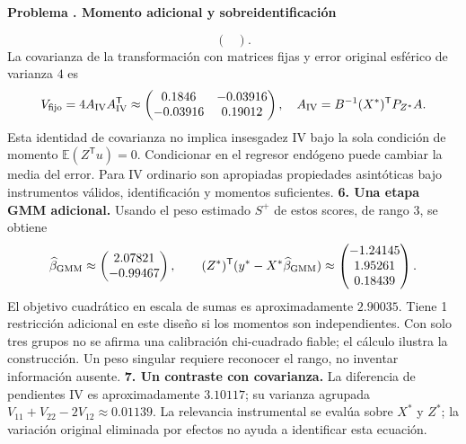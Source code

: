 \documentclass[11pt,a4paper]{article}
\newcommand{\E}{\mathbb E}
\newcommand{\T}{^{\mathsf T}}
\theoremstyle{definition}
\newcounter{problema}
\newenvironment{resuelto}[1]{\refstepcounter{problema}\par\medskip\Needspace{6\baselineskip}\textbf{Problema \theproblema. #1}\par}{\par\medskip}
\begin{document}
\begin{resuelto}{Momento adicional y sobreidentificación}
\[\begin{pmatrix}
\end{pmatrix}.
\]
La covarianza de la transformación con matrices fijas y error original esférico de varianza $4$ es
\[
V_{\rm fijo}=4A_{\rm IV}A_{\rm IV}\T\approx\begin{pmatrix}
0.1846&-0.03916\\-0.03916&0.19012
\end{pmatrix},\quad A_{\rm IV}=B^{-1}(X^*)\T P_{Z^*}A.
\]
Esta identidad de covarianza no implica insesgadez IV bajo la sola condición de momento $\E(Z\T u)=0$. Condicionar en el regresor endógeno puede cambiar la media del error. Para IV ordinario son apropiadas propiedades asintóticas bajo instrumentos válidos, identificación y momentos suficientes.
\textbf{6. Una etapa GMM adicional.} Usando el peso estimado $S^+$ de estos scores, de rango $3$, se obtiene
\[
\widehat\beta_{\rm GMM}\approx\begin{pmatrix}
2.07821\\-0.99467
\end{pmatrix},\qquad
(Z^*)\T(y^*-X^*\widehat\beta_{\rm GMM})\approx\begin{pmatrix}
-1.24145\\1.95261\\0.18439
\end{pmatrix}.
\]
El objetivo cuadrático en escala de sumas es aproximadamente $2.90035$. Tiene 1 restricción adicional en este diseño si los momentos son independientes. Con solo tres grupos no se afirma una calibración chi-cuadrado fiable; el cálculo ilustra la construcción. Un peso singular requiere reconocer el rango, no inventar información ausente.
\textbf{7. Un contraste con covarianza.} La diferencia de pendientes IV es aproximadamente $3.10117$; su varianza agrupada $V_{11}+V_{22}-2V_{12}\approx0.01139$. La relevancia instrumental se evalúa sobre $X^*$ y $Z^*$; la variación original eliminada por efectos no ayuda a identificar esta ecuación.
\end{resuelto}
\end{document}
